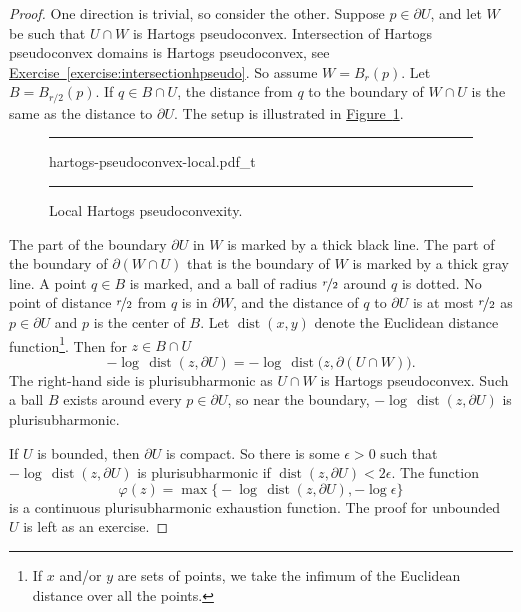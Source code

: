 \documentclass[12pt,openany]{book}
\theoremstyle{plain}
\theoremstyle{remark}
\theoremstyle{definition}
\newenvironment{myfig}{%
\begin{figure}[h!t]
\noindent\rule{\textwidth}{0.5pt}\vspace{12pt}\par\centering}%
{\par\noindent\rule{\textwidth}{0.5pt}
\end{figure}}
\theoremstyle{exercise}
\theoremstyle{example}
\newcommand{\figureref}[1]{\hyperref[#1]{Figure~\ref*{#1}}}
\newcommand{\exerciseref}[1]{\hyperref[#1]{Exercise~\ref*{#1}}}
\begin{document}
\begin{proof}
One direction is trivial, so consider the other.
Suppose $p \in \partial U$, and let
$W$ be such that $U \cap W$
is Hartogs pseudoconvex.  Intersection of
Hartogs pseudoconvex domains is Hartogs pseudoconvex,
see \exerciseref{exercise:intersectionhpseudo}.
So assume $W = B_r(p)$.
Let $B = B_{r/2}(p)$.  If $q \in B \cap U$, the distance from $q$ to the boundary of $W \cap U$ is the same as
the distance to $\partial U$.  The setup is illustrated in
\figureref{fig:hartogs-pseudoconvex-local}.

\begin{myfig}
{hartogs-pseudoconvex-local.pdf_t}
\caption{Local Hartogs pseudoconvexity.\label{fig:hartogs-pseudoconvex-local}}
\end{myfig}

The part of the boundary $\partial U$ in $W$ is marked by a thick
black line.
The part of the boundary of $\partial (W \cap U)$ that is
the boundary of $W$ is marked by a thick gray line.  A point $q \in B$ is
marked, and a ball of radius $\nicefrac{r}{2}$ around $q$ is dotted.
No point of distance $\nicefrac{r}{2}$ from $q$ is in $\partial W$, and
the distance of $q$ to $\partial U$ is at most $\nicefrac{r}{2}$ as $p \in \partial U$
and $p$ is the center of $B$.
%
Let $\operatorname{dist}(x,y)$ denote the
Euclidean distance function\footnote{If $x$ and/or $y$ are sets
of points, we take the infimum of the Euclidean distance over all the points.}.
Then for $z \in B \cap U$
\begin{equation*}
- \log \, \operatorname{dist}(z, \partial U) =
- \log \, \operatorname{dist}\bigl(z, \partial (U \cap W)\bigr).
\end{equation*}
The right-hand side is plurisubharmonic as $U \cap W$ is Hartogs
pseudoconvex.  Such a ball $B$ exists around every $p \in \partial U$, so near
the boundary, $- \log \, \operatorname{dist}(z, \partial U)$ is
plurisubharmonic.

If $U$ is bounded, then $\partial U$ is compact.  So there is some
$\epsilon > 0$ such that $- \log \, \operatorname{dist}(z, \partial U)$
is plurisubharmonic if $\operatorname{dist}(z, \partial U) < 2\epsilon$.
The function
\begin{equation*}
\varphi(z) = \max \bigl\{
- \log \, \operatorname{dist}(z, \partial U) , - \log \epsilon \bigr\}
\end{equation*}
is a continuous plurisubharmonic exhaustion function.
The proof for
unbounded $U$ is left as an exercise.
\end{proof}
\end{document}
